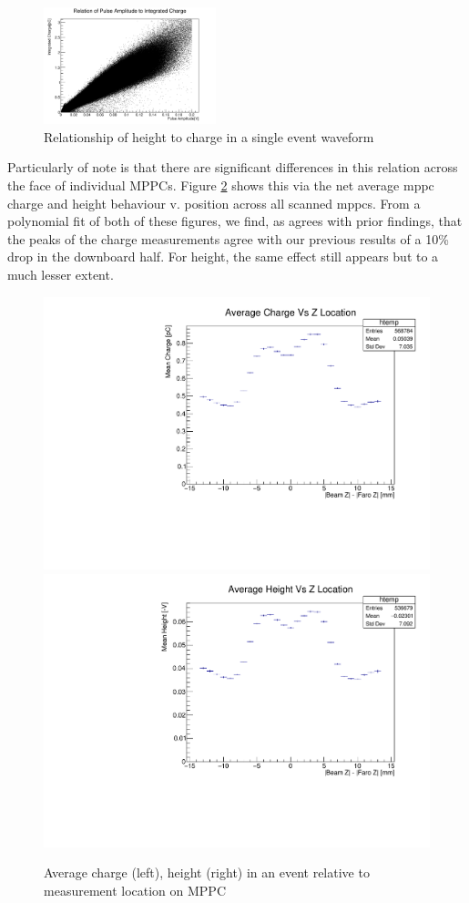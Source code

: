 \begin{figure}
    \centering
    \includegraphics[width=5cm]{graphics/qvamp-1.png}
    \caption{Relationship of height to charge in a single event waveform}
    \label{fig:qvsamp}
\end{figure}

Particularly of note is that there are significant differences in this relation across the face of individual MPPCs.
Figure \ref{fig:heightvzplot} shows this via the net average mppc charge and height behaviour v. position across all scanned mppcs.
From a polynomial fit of both of these figures, we find, as agrees with prior findings, that the peaks of the charge measurements agree with our previous results of a 10\% drop in the downboard half. For height, the same effect still appears but to a much lesser extent.

\begin{figure}
\centering

\includegraphics[width=4 cm]{graphics/chargevsz.pdf}
\includegraphics[width=4 cm]{graphics/heightvsz.pdf}
\caption{Average charge (left), height (right) in an event relative to measurement location on MPPC}
\label{fig:heightvzplot}
\end{figure}

